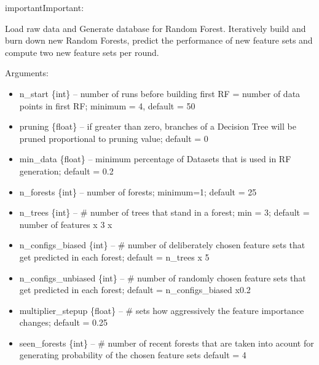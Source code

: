 \documentclass[letterpaper,10pt,english]{sphinxmanual}
\begin{document}
\begin{sphinxadmonition}{important}{Important:}


\begin{fulllineitems}
Load raw data and Generate database for Random Forest. Iteratively build and burn down new Random Forests, predict the performance of new feature sets and compute two new feature sets per round.

Arguments:
\begin{itemize}
\item {} 
n\_start \{int\} -- number of runs before building first RF = number of data points in first RF; minimum = 4, default = 50

\item {} 
pruning \{float\} -- if greater than zero, branches of a Decision Tree will be pruned proportional to pruning value; default = 0

\item {} 
min\_data \{float\} -- minimum percentage of Datasets that is used in RF generation; default = 0.2

\item {} 
n\_forests \{int\} -- number of forests; minimum=1;  default = 25

\item {} 
n\_trees \{int\} -- \# number of trees that stand in a forest; min = 3; default = number of features x 3 x

\item {} 
n\_configs\_biased \{int\} -- \# number of deliberately chosen feature sets that get predicted in each forest; default = n\_trees x 5

\item {} 
n\_configs\_unbiased \{int\} -- \# number of randomly chosen feature sets that get predicted in each forest; default = n\_configs\_biased x0.2

\item {} 
multiplier\_stepup \{float\} -- \# sets how aggressively the feature importance changes; default = 0.25

\item {} 
seen\_forests \{int\} -- \# number of recent forests that are taken into acount for generating probability of the chosen feature sets default = 4


\end{itemize}
\end{fulllineitems}
\end{sphinxadmonition}
\end{document}
